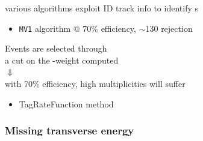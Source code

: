 \begin{frame}
\begin{minipage}{.4\textwidth}
various algorithms exploit ID track info to identify \bjet s

\begin{itemize}
\item \texttt{\cccolor MV1} algorithm @ 70\% efficiency, $\sim 130$ rejection
\end{itemize}

\end{minipage}\begin{minipage}{.6\textwidth}\centering

Events are selected through \\a cut on the \btag-weight computed\\
{\large$\Downarrow$}\\
with 70\% efficiency, high multiplicities will suffer

\begin{itemize}
\item {\cccolor TagRateFunction} method
\end{itemize}


\end{minipage}


\end{frame}



\begin{frame}\frametitle{Missing transverse energy}
\centering\myskip

\end{frame}

